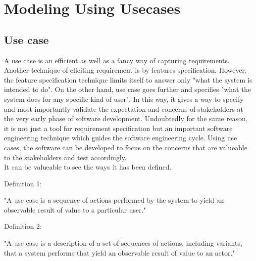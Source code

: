 \chapter{Modeling Using Usecases}\label{chapter:selection_by_use_case}
\section{Use case}\label{section:selection_by_use_case/use_case}
A use case is an efficient as well as a fancy way of capturing requirements. Another technique of eliciting requirement is by features specification. However, the feature specification technique limits itself to answer only "what the system is intended to do". On the other hand, use case goes further and specifies "what the system does for any specific kind of user". In this way, it gives a way to specify and most importantly validate the expectation and concerns of stakeholders at the very early phase of software development. Undoubtedly for the same reason, it is not just a tool for requirement specification but an important software engineering technique which guides the software engineering cycle. Using use cases, the software can be developed to focus on the concerns that are valueable to the stakeholders and test accordingly.\cite{Ng:2004aa}
\\
It can be valueable to see the ways it has been defined.
\begin{shaded}Definition 1: \cite{Jacobson:1987aa} \end{shaded}
"A use case is a sequence of actions performed by the system to yield an observable result of value to a particular user." 
\\
\begin{shaded}Definition 2: \cite{Rumbaugh:1999aa}\end{shaded}
"A use case is a description of a set of sequences of actions, including variants, that a system performs that yield an observable result of value to an actor."


